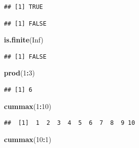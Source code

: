 \documentclass[10pt,]{krantz}
\makeatletter
\newenvironment{Shaded}{\begin{snugshade}}{\end{snugshade}}
\newcommand{\KeywordTok}[1]{\textcolor[rgb]{0.13,0.29,0.53}{\textbf{#1}}}
\newcommand{\DecValTok}[1]{\textcolor[rgb]{0.00,0.00,0.81}{#1}}
\newcommand{\StringTok}[1]{\textcolor[rgb]{0.31,0.60,0.02}{#1}}
\newcommand{\OtherTok}[1]{\textcolor[rgb]{0.56,0.35,0.01}{#1}}
\newcommand{\OperatorTok}[1]{\textcolor[rgb]{0.81,0.36,0.00}{\textbf{#1}}}
\newcommand{\NormalTok}[1]{#1}
\newenvironment{kframe}{%
\medskip{}
\setlength{\fboxsep}{.8em}
 \def\at@end@of@kframe{}%
 \ifinner\ifhmode%
  \def\at@end@of@kframe{\end{minipage}}%
  \begin{minipage}{\columnwidth}%
 \fi\fi%
 \def\FrameCommand##1{\hskip\@totalleftmargin \hskip-\fboxsep
 \colorbox{shadecolor}{##1}\hskip-\fboxsep
     \hskip-\linewidth \hskip-\@totalleftmargin \hskip\columnwidth}%
 \MakeFramed {\advance\hsize-\width
   \@totalleftmargin\z@ \linewidth\hsize
   \@setminipage}}%
 {\par\unskip\endMakeFramed%
 \at@end@of@kframe}
\renewenvironment{Shaded}{\begin{kframe}}{\end{kframe}}
\makeatother
\begin{document}
\begin{verbatim}
## [1] TRUE
\end{verbatim}

\begin{Shaded}
\end{Shaded}

\begin{verbatim}
## [1] FALSE
\end{verbatim}

\begin{Shaded}
\begin{Highlighting}[]
\KeywordTok{is.finite}\NormalTok{(}\OtherTok{Inf}\NormalTok{)}
\end{Highlighting}
\end{Shaded}

\begin{verbatim}
## [1] FALSE
\end{verbatim}

\begin{Shaded}
\begin{Highlighting}[]
\KeywordTok{prod}\NormalTok{(}\DecValTok{1}\OperatorTok{:}\DecValTok{3}\NormalTok{)}
\end{Highlighting}
\end{Shaded}

\begin{verbatim}
## [1] 6
\end{verbatim}

\begin{Shaded}
\begin{Highlighting}[]
\KeywordTok{cummax}\NormalTok{(}\DecValTok{1}\OperatorTok{:}\DecValTok{10}\NormalTok{)}
\end{Highlighting}
\end{Shaded}

\begin{verbatim}
##  [1]  1  2  3  4  5  6  7  8  9 10
\end{verbatim}

\begin{Shaded}
\begin{Highlighting}[]
\KeywordTok{cummax}\NormalTok{(}\DecValTok{10}\OperatorTok{:}\DecValTok{1}\NormalTok{)}
\end{Highlighting}
\end{Shaded}
\end{document}
